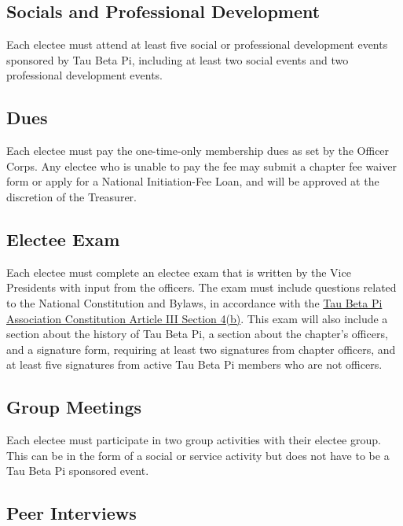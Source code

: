 \subsection{Socials and Professional Development} \label{A.4} %
Each electee must attend at least five social or professional development events sponsored by Tau Beta Pi, including at least two social events and two professional development events.


\subsection{Dues} \label{A.5}

Each electee must pay the one-time-only membership dues as set by the Officer Corps. 
Any electee who is unable to pay the fee may submit a chapter fee waiver form or apply for a National Initiation-Fee Loan, and will be approved at the discretion of the Treasurer.


\subsection{Electee Exam} \label{A.6}

Each electee must complete an electee exam that is written by the Vice Presidents with input from the officers. 
The exam must include questions related to the National Constitution and Bylaws, 
in accordance with the \href{http://www.tbp.org/off/ConstBylaw.pdf}{Tau Beta Pi Association Constitution Article III Section 4(b)}. 
This exam will also include a section about the history of Tau Beta Pi, a section about the chapter’s officers, and a signature form, 
requiring at least two signatures from chapter officers, and at least five signatures from active Tau Beta Pi members who are not officers.

\subsection{Group Meetings} \label{A.7}

Each electee must participate in two group activities with their electee group. 
This can be in the form of a social or service activity but does not have to be a Tau Beta Pi sponsored event.

\subsection{Peer Interviews} \label{A.8}

